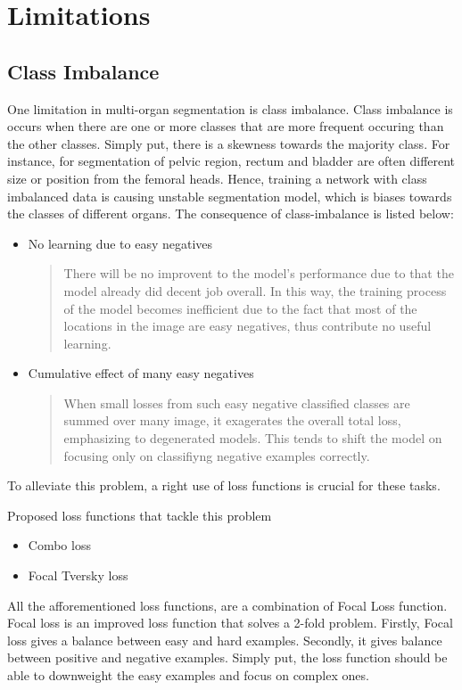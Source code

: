 \chapter{Limitations} \label{chap:limitations}

\section{Class Imbalance}
One limitation in multi-organ segmentation is class imbalance. Class imbalance is occurs 
when there are one or more classes that are more frequent occuring than the other classes. 
Simply put, there is a skewness towards the majority class.
For instance, for segmentation of pelvic region, rectum and bladder 
are often different size or position from the femoral heads.
Hence, training a network with class imbalanced data is causing 
unstable segmentation model, which is biases towards the classes 
of different organs. The consequence of class-imbalance is listed below:
\begin{itemize}
        \item No learning due to easy negatives
        \begin{abstract}
                There will be no improvent to the model's performance due to that the model already did decent job overall.
                In this way, the training process of the model becomes inefficient due to the fact that most of the locations 
                in the image are easy negatives, thus contribute no useful learning.
        \end{abstract}
        \item Cumulative effect of many easy negatives
        \begin{abstract}
                When small losses from such easy negative classified classes are summed over many image,
                it exagerates the overall total loss, emphasizing to degenerated models. This tends to shift the model on 
                focusing only on classifiyng negative examples correctly.
        \end{abstract}
\end{itemize}

To alleviate this problem, a right use of loss 
functions is crucial for these tasks.

Proposed loss functions that tackle this problem
\begin{itemize}
        \item Combo loss
        \item Focal Tversky loss
\end{itemize}
All the afforementioned loss functions, are a combination of Focal Loss function. 
Focal loss is an improved loss function that solves a 2-fold problem. 
Firstly, Focal loss gives a balance between easy and hard examples. Secondly, it gives balance between positive and negative examples.
Simply put, the loss function should be able to downweight the easy examples and focus on complex ones.

